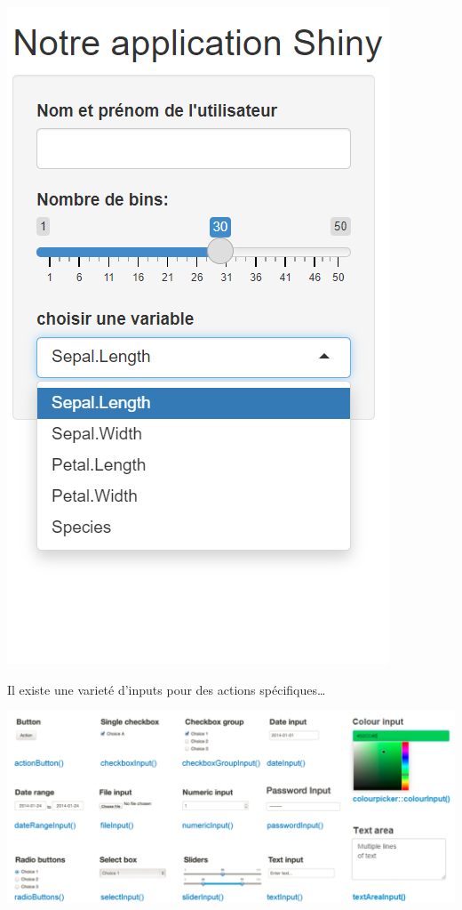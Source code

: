 \documentclass[
]{article}
\begin{document}
\includegraphics{images/clipboard-1248618430.png}

Il existe une varieté d'inputs pour des actions spécifiques\ldots{}

\includegraphics{images/clipboard-690820220.png}
\end{document}
